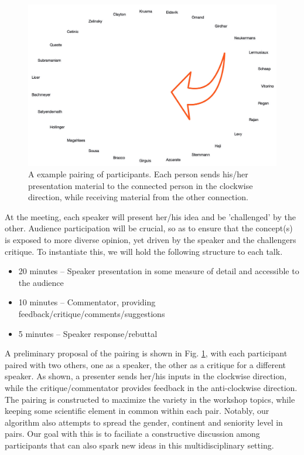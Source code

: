 \begin{figure}[!t]
  \centering 
  \includegraphics[scale=0.15]{fig/pairing.jpg}
  \caption{A example pairing of participants. Each person sends
    his/her presentation material to the connected person in the
    clockwise direction, while receiving material from the other
    connection.}
  \label{fig:pairs}
\end{figure}

At the meeting, each speaker will present her/his idea and be
'challenged' by the other. Audience participation will be crucial, so as
to ensure that the concept(s) is exposed to more diverse opinion, yet
driven by the speaker and the challengers critique. To instantiate this,
we will hold the following structure to each talk.

\begin{itemize}[noitemsep,topsep=0pt,parsep=0pt,partopsep=0pt]

\item 20 minutes -- Speaker presentation in some measure of
  detail and accessible to the audience
\item 10 minutes -- Commentator, providing
  feedback/critique/comments/suggestions
\item 5 minutes -- Speaker response/rebuttal

\end{itemize}

A preliminary proposal of the pairing is shown in
Fig. \ref{fig:pairs}, with each participant paired with two others,
one as a speaker, the other as a critique for a different speaker. As
shown, a presenter sends her/his inputs in the clockwise direction,
while the critique/commentator provides feedback in the anti-clockwise
direction.  The pairing is constructed to maximize the variety in the
workshop topics, while keeping some scientific element in common
within each pair. Notably, our algorithm also attempts to spread the
gender, continent and seniority level in pairs. Our goal with this is
to faciliate a constructive discussion among participants that can
also spark new ideas in this multidisciplinary setting.

